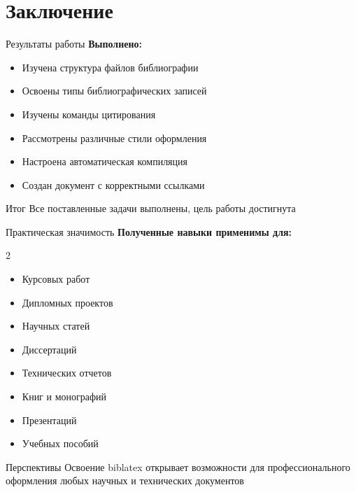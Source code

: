 \documentclass[aspectratio=169, 12pt]{beamer}
\begin{document}
\section{Заключение}

\begin{frame}{Результаты работы}
  \textbf{Выполнено:}
  
  \begin{itemize}
    \item[\faCheckCircle] Изучена структура файлов библиографии
    \item[\faCheckCircle] Освоены типы библиографических записей
    \item[\faCheckCircle] Изучены команды цитирования
    \item[\faCheckCircle] Рассмотрены различные стили оформления
    \item[\faCheckCircle] Настроена автоматическая компиляция
    \item[\faCheckCircle] Создан документ с корректными ссылками
  \end{itemize}
  
  \vspace{0.5cm}
  
  \begin{block}{Итог}
    Все поставленные задачи выполнены, цель работы достигнута
  \end{block}
\end{frame}

\begin{frame}{Практическая значимость}
  \textbf{Полученные навыки применимы для:}
  
  \begin{multicols}{2}
    \begin{itemize}
      \item Курсовых работ
      \item Дипломных проектов
      \item Научных статей
      \item Диссертаций
      \item Технических отчетов
      \item Книг и монографий
      \item Презентаций
      \item Учебных пособий
    \end{itemize}
  \end{multicols}
  
  \vspace{0.5cm}
  
  \begin{exampleblock}{Перспективы}
    Освоение biblatex открывает возможности для профессионального оформления любых научных и технических документов
  \end{exampleblock}
\end{frame}
\end{document}
